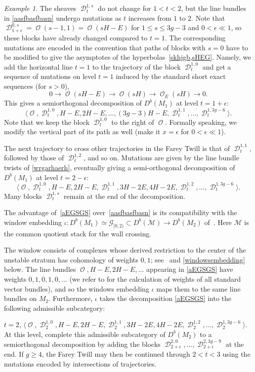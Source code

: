 \documentclass[11pt,letterpaper]{amsart}
\theoremstyle{plain}
\theoremstyle{definition}
\theoremstyle{remark}
\newtheorem{example}[theorem]{Example}
\numberwithin{equation}{section}
\DeclareMathOperator{\cD}{\mathcal{D}}
\DeclareMathOperator{\cO}{\mathcal{O}}
\begin{document}
\begin{example}
The sheaves $\cD^{1,s}_t$ do not change for $1<t<2$, but the line bundles in \eqref{aasfbasfbasn} undergo mutations as $t$ increases from $1$ to $2$.
Note that
$\cD^{0,s}_{1+\epsilon}=\cO(s-1,1)=\cO(sH-E)$ for $1\le s\le3g-3$ and $0<\epsilon\ll1$, so 
these  blocks have already changed compared to $t=1$. The corresponding mutations are encoded in the 
convention that paths of blocks with $s=0$ have to be modified to give the  asymptotes of the hyperbolas~\eqref{skhjgb,sHEG}.
Namely, we add the horizontal line $t=1$ to the trajectory of the block $\cD^{1,0}_t$ and
get a sequence of mutations on level $t=1$ induced by the standard short exact sequences (for $s>0$), 
\begin{equation}\label{wrgarhaerh}
0\to\cO(sH-E)\to\cO(sH)\to\cO_E(sH)\to0.
\end{equation}
This gives a semiorthogonal decomposition of $D^b(M_1)$ at level $t=1+\epsilon$:
$$\langle\cO,\cD^{1,0}_t,H-E,2H-E,\ldots,(3g-3)H-E,\cD^{1,1}_t,\ldots,\cD^{1,3g-6}_t\rangle.
$$
Note that we keep the block $\cD^{1,0}_t$ to the right of $\cO$. Formally speaking, we modify the vertical part of its path as well (make it $x=\epsilon$
for $0<\epsilon\ll1$).

The next trajectory to cross other trajectories in the Farey Twill is that of $\cD^{1,1}_t$, followed by those of $\cD^{1,2}_t$, and so on.
Mutations are given by the line bundle twists of \eqref{wrgarhaerh}, eventually
giving a semi-orthogonal decomposition of $D^b(M_1)$  at level $t=2-\epsilon$:
\begin{equation}\label{aEGSGS}
\langle\cO,\cD^{1,0}_t,H-E,2H-E,\cD^{1,1}_t,3H-2E,4H-2E,\cD^{1,2}_t,\ldots,\cD^{1,3g-6}_t\rangle.
\end{equation}
Many blocks $\cD^{1,s}_t$ remain at the end of the decomposition.


The advantage of~\eqref{aEGSGS} over~\eqref{aasfbasfbasn}
is its compatibility with the window embedding
$
 \iota:D^b(M_1)\simeq\mathcal G_{[0,2)}
 \subset D^b(\mathcal M)\longrightarrow D^b(M_2)
$
of~\cite[Proposition~3.18]{TT}. Here $\mathcal M$ is the common
quotient stack for the wall crossing. 


The window consists of complexes
whose derived restriction to the center of the unstable stratum has
cohomology of weights $0,1$; see~\cite[Theorem~3.21]{TT} and
\eqref{windowsembedding} below.
The line bundles $\cO,H-E,2H-E,\ldots$ appearing
in \eqref{aEGSGS}
have weights $0,1,0,1,0,\ldots$ (we refer to \cite[Section~3]{TT} for the calculation of weights of all standard vector bundles), and so the windows
embedding $\iota$ maps them to the same line bundles on $M_2$. 
Furthermore, $\iota$ takes the decomposition  \eqref{aEGSGS}
into the following admissible subcategory:

$\boxed{t=2}$,
$\langle\cO,\cD^{1,0}_2,H-E,2H-E,\cD^{1,1}_2,3H-2E,4H-2E,\cD^{1,2}_2,\ldots,\cD^{1,3g-6}_2\rangle$.
At this level, complete this admissible subcategory of $D^b(M_2)$
to a semiorthogonal decomposition by adding the blocks
$\cD^{2,0}_{2+\epsilon},\ldots,\cD^{2,3g-9}_{2+\epsilon}$ at the end.
If $g\ge4$, the Farey Twill may then be continued through
$\boxed{2<t<3}$ using the mutations encoded by intersections of
trajectories. 
\end{example}
\end{document}
